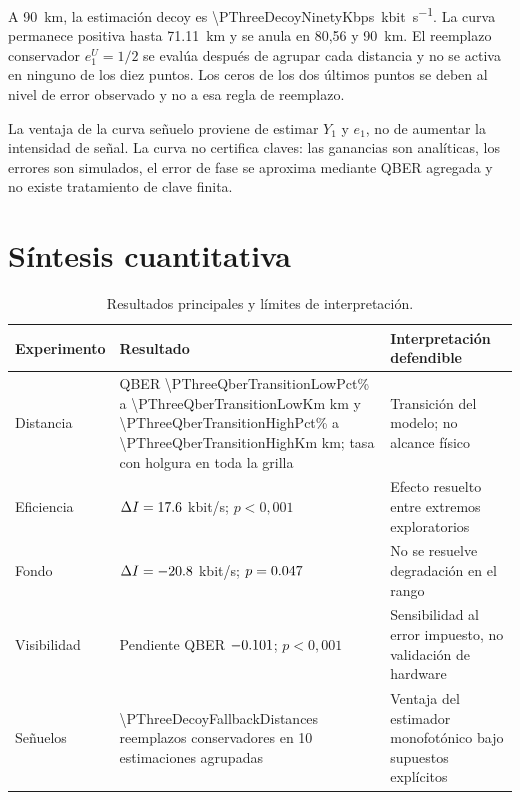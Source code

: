 A \SI{90}{\kilo\meter}, la estimación decoy es \SI[round-mode=places,round-precision=1]{\PThreeDecoyNinetyKbps}{\kilo bit\per\second}. La curva permanece positiva hasta \SI{71.11}{\kilo\meter} y se anula en 80,56 y \SI{90}{\kilo\meter}. El reemplazo conservador \(e_1^U=1/2\) se evalúa después de agrupar cada distancia y no se activa en ninguno de los diez puntos. Los ceros de los dos últimos puntos se deben al nivel de error observado y no a esa regla de reemplazo.

La ventaja de la curva señuelo proviene de estimar \(Y_1\) y \(e_1\), no de aumentar la intensidad de señal. La curva no certifica claves: las ganancias son analíticas, los errores son simulados, el error de fase se aproxima mediante QBER agregada y no existe tratamiento de clave finita.

\section{Síntesis cuantitativa}

\begin{table}[H]
  \centering
  \small
  \begin{tabularx}{\textwidth}{p{}p{}X}
    \toprule
    Experimento & Resultado & Interpretación defendible \\
    \midrule
    Distancia & QBER \num[round-mode=places,round-precision=3]{\PThreeQberTransitionLowPct}\% a \num[round-mode=places,round-precision=2]{\PThreeQberTransitionLowKm} km y \num[round-mode=places,round-precision=3]{\PThreeQberTransitionHighPct}\% a \num[round-mode=places,round-precision=2]{\PThreeQberTransitionHighKm} km; tasa con holgura en toda la grilla & Transición del modelo; no alcance físico \\
    Eficiencia & \(\Delta I=\num[round-mode=places,round-precision=1]{\PThreeEffDifferenceKbps}\) kbit/s; \(p<0{,}001\) & Efecto resuelto entre extremos exploratorios \\
    Fondo & \(\Delta I=\num[round-mode=places,round-precision=1]{\PThreeDarkDifferenceKbps}\) kbit/s; \(p=\num[round-mode=places,round-precision=3]{\PThreeDarkPValue}\) & No se resuelve degradación en el rango \\
    Visibilidad & Pendiente QBER \(\num[round-mode=places,round-precision=3]{\PThreeVisibilityQberSlope}\); \(p<0{,}001\) & Sensibilidad al error impuesto, no validación de hardware \\
    Señuelos & \num{\PThreeDecoyFallbackDistances} reemplazos conservadores en 10 estimaciones agrupadas & Ventaja del estimador monofotónico bajo supuestos explícitos \\
    \bottomrule
  \end{tabularx}
  \caption{Resultados principales y límites de interpretación.}
  \label{tab:sintesis_resultados}
\end{table}

